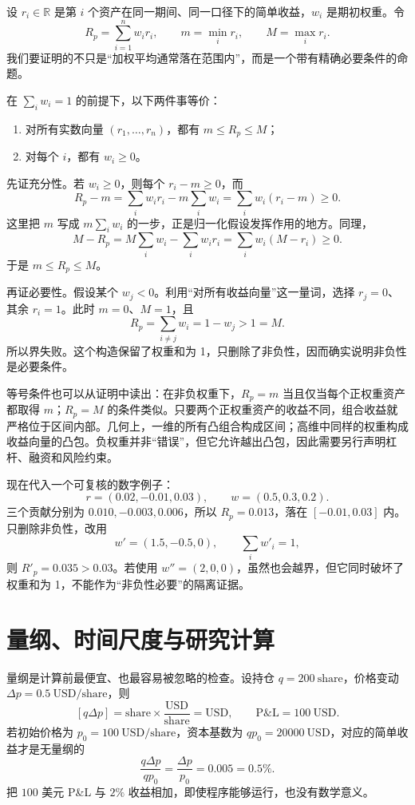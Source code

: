 设 $r_i\in\mathbb R$ 是第 $i$ 个资产在同一期间、同一口径下的简单收益，$w_i$ 是期初权重。令
\[
  R_p=\sum_{i=1}^n w_i r_i,\qquad
  m=\min_i r_i,\qquad M=\max_i r_i.
\]
我们要证明的不只是“加权平均通常落在范围内”，而是一个带有精确必要条件的命题。

\begin{theorem}[凸组合界]
在 $\sum_iw_i=1$ 的前提下，以下两件事等价：
\begin{enumerate}
  \item 对所有实数向量 $(r_1,\ldots,r_n)$，都有 $m\leq R_p\leq M$；
  \item 对每个 $i$，都有 $w_i\geq0$。
\end{enumerate}
\end{theorem}

先证充分性。若 $w_i\geq0$，则每个 $r_i-m\geq0$，而
\[
 R_p-m
 =\sum_iw_ir_i-m\sum_iw_i
 =\sum_iw_i(r_i-m)\geq0.
\]
这里把 $m$ 写成 $m\sum_iw_i$ 的一步，正是归一化假设发挥作用的地方。同理，
\[
 M-R_p
 =M\sum_iw_i-\sum_iw_ir_i
 =\sum_iw_i(M-r_i)\geq0.
\]
于是 $m\leq R_p\leq M$。

再证必要性。假设某个 $w_j<0$。利用“对所有收益向量”这一量词，选择 $r_j=0$、其余 $r_i=1$。此时 $m=0$、$M=1$，且
\[
  R_p=\sum_{i\ne j}w_i=1-w_j>1=M.
\]
所以界失败。这个构造保留了权重和为 1，只删除了非负性，因而确实说明非负性是必要条件。

等号条件也可以从证明中读出：在非负权重下，$R_p=m$ 当且仅当每个正权重资产都取得 $m$；$R_p=M$ 的条件类似。只要两个正权重资产的收益不同，组合收益就严格位于区间内部。几何上，一维的所有凸组合构成区间；高维中同样的权重构成收益向量的凸包。负权重并非“错误”，但它允许越出凸包，因此需要另行声明杠杆、融资和风险约束。

现在代入一个可复核的数字例子：
\[
  r=(0.02,-0.01,0.03),\qquad w=(0.5,0.3,0.2).
\]
三个贡献分别为 $0.010,-0.003,0.006$，所以 $R_p=0.013$，落在 $[-0.01,0.03]$ 内。只删除非负性，改用
\[
  w'=(1.5,-0.5,0),\qquad \sum_iw'_i=1,
\]
则 $R'_p=0.035>0.03$。若使用 $w''=(2,0,0)$，虽然也会越界，但它同时破坏了权重和为 1，不能作为“非负性必要”的隔离证据。

\section{量纲、时间尺度与研究计算}

量纲是计算前最便宜、也最容易被忽略的检查。设持仓 $q=200\ \mathrm{share}$，价格变动 $\Delta p=0.5\ \mathrm{USD/share}$，则
\[
 [q\Delta p]
 =\mathrm{share}\times\frac{\mathrm{USD}}{\mathrm{share}}
 =\mathrm{USD},\qquad \mathrm{P\&L}=100\ \mathrm{USD}.
\]
若初始价格为 $p_0=100\ \mathrm{USD/share}$，资本基数为 $qp_0=20000\ \mathrm{USD}$，对应的简单收益才是无量纲的
\[
  \frac{q\Delta p}{qp_0}=\frac{\Delta p}{p_0}=0.005=0.5\%.
\]
把 $100$ 美元 P\&L 与 $2\%$ 收益相加，即使程序能够运行，也没有数学意义。

